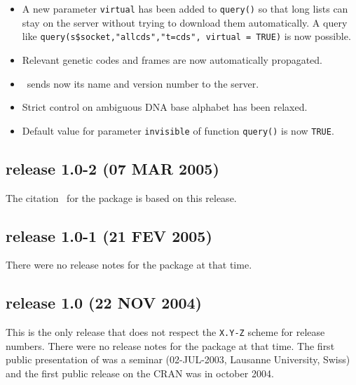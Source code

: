 \documentclass{article}
\begin{document}
\begin{itemize}
\item A new parameter \texttt{virtual} has been added to \texttt{query()}
so that long lists can stay on the server without trying to download
them automatically. A query like \texttt{query(s\$socket,"allcds","t=cds", virtual = TRUE)} is
now possible.

\item Relevant genetic codes and frames are now automatically propagated.

\item \Seqinr{}~sends now its name and version number to the server.

\item Strict control on ambiguous DNA base alphabet has been relaxed.

\item Default value for parameter \texttt{invisible} of function \texttt{query()} is now \texttt{TRUE}.

\end{itemize}

\subsection*{release 1.0-2 (07 MAR 2005)}

The citation~\cite{seqinr} for the \seqinr{} package is based on this release.

\subsection*{release 1.0-1 (21 FEV 2005)}

There were no release notes for the \seqinr{} package at that time.

\subsection*{release 1.0 (22 NOV 2004)}

This is the only release that does not respect the \texttt{X.Y-Z} scheme for release numbers. There were no release notes for the \seqinr{} package at that time. The first public presentation of \seqinr{} was a seminar (02-JUL-2003, Lausanne University, Swiss) and the first public release on the CRAN was in october 2004.
\end{document}
